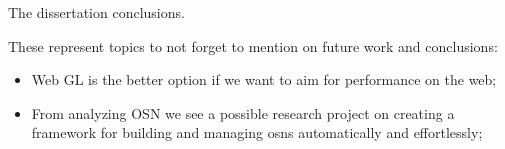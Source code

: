 The dissertation conclusions.

These represent topics to not forget to mention on future work and conclusions:
\begin{itemize}
    \item Web GL is the better option if we want to aim for performance on the web;
    \item From analyzing OSN we see a possible research project on creating a framework for building
    and managing \glspl{osn} automatically and effortlessly;
\end{itemize}
